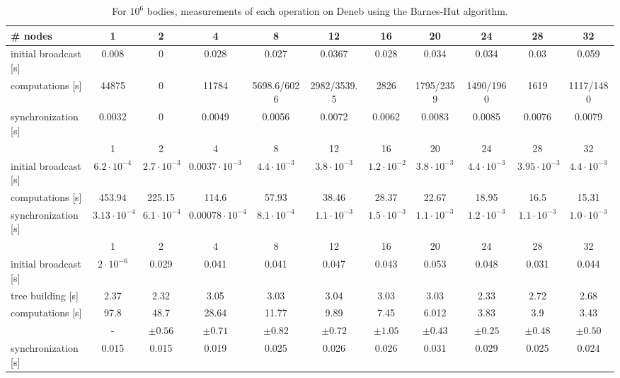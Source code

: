\begin{table}
\centering
\begin{tabular}{l|cccccccccc}
\# nodes & 1 & 2 & 4 & 8 & 12 & 16 & 20 & 24 & 28 & 32\\
\hline initial broadcast [s] & 0.008 & 0 & 0.028 & 0.027 & 0.0367 & 0.028 & 0.034 & 0.034 & 0.03 & 0.059\\
computations [s] & 44875 & 0 & 11784 & 5698.6/6026 & 2982/3539.5 & 2826 & 1795/2359 & 1490/1960 &1619 & 1117/1480\\
synchronization [s] & 0.0032 & 0 & 0.0049 & 0.0056 & 0.0072 & 0.0062 & 0.0083 & 0.0085 & 0.0076& 0.0079\\
\end{ŧabular}
\caption{$10^6$ bodies}
\end{table}

\begin{table}
\centering
\begin{tabular}{l|cccccccccc}
\# nodes & 1 & 2 & 4 & 8 & 12 & 16 & 20 & 24 & 28 & 32\\
\hline initial broadcast [s] & $6.2\cdot 10^{-4}$ & $2.7\cdot 10^{-3}$ & $0.0037\cdot 10^{-3}$ & $4.4\cdot 10^{-3}$ & $3.8\cdot 10^{-3}$ & $1.2\cdot 10^{-2}$ & $3.8\cdot 10^{-3}$ & $4.4\cdot 10^{-3}$ & $3.95\cdot 10^{-3}$ & $4.4\cdot 10^{-3}$\\
computations [s] & 453.94 & 225.15 & 114.6 & 57.93 & 38.46 & 28.37 & 22.67 & 18.95 & 16.5 & 15.31\\
synchronization [s] & $3.13\cdot 10^{-4}$ & $6.1\cdot 10^{-4}$ & $0.00078\cdot 10^{-4}$ & $8.1\cdot 10^{-4}$ & $1.1\cdot 10^{-3}$ & $1.5\cdot 10^{-3}$ & $1.1\cdot 10^{-3}$ & $1.2\cdot 10^{-3}$ & $1.1\cdot 10^{-3}$ & $1.0\cdot 10^{-3}$\\
\end{ŧabular}
\caption{$10^5$ bodies}
\end{table}

\begin{table}
\centering
\begin{tabular}{l|cccccccccc}
\# nodes & 1 & 2 & 4 & 8 & 12 & 16 & 20 & 24 & 28 & 32\\
\hline initial broadcast [s] & $2\cdot10^{-6}$ & 0.029 & 0.041 & 0.041 & 0.047 & 0.043 & 0.053 & 0.048 & 0.031 & 0.044\\
tree building [s] & 2.37 & 2.32 & 3.05 & 3.03 & 3.04 & 3.03 & 3.03 & 2.33 & 2.72 & 2.68\\
computations [s] & 97.8 & 48.7 & 28.64 & 11.77 & 9.89 & 7.45 & 6.012 & 3.83 & 3.9 & 3.43 \\
& - & $\pm 0.56$ & $\pm 0.71$ & $\pm 0.82$ & $\pm 0.72$ & $\pm 1.05$ & $\pm 0.43$ & $\pm 0.25$ & $\pm 0.48$ & $\pm 0.50$  \\
synchronization [s] & 0.015 & 0.015 & 0.019 & 0.025 & 0.026 & 0.026 & 0.031 & 0.029 & 0.025 &0.024\\
\end{tabular}
\caption{For $10^6$ bodies, measurements of each operation on Deneb using the Barnes-Hut algorithm.}
\label{tab:qt:measure}
\end{table}

